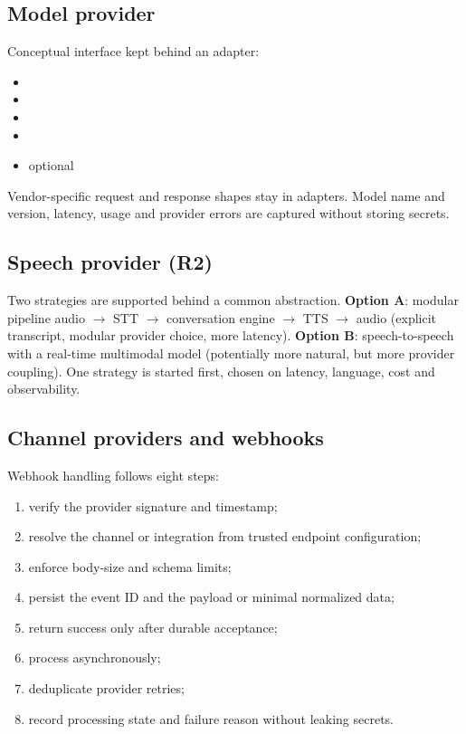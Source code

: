 \subsection{Model provider}
Conceptual interface kept behind an adapter:
\begin{itemize}
  \item {}
  \item {}
  \item {}
  \item {}
  \item optional 
\end{itemize}
Vendor-specific request and response shapes stay in adapters. Model name and version, latency, usage and provider errors are captured without storing secrets.

\subsection{Speech provider (R2)}
Two strategies are supported behind a common abstraction. \textbf{Option A}: modular pipeline audio $\rightarrow$ STT $\rightarrow$ conversation engine $\rightarrow$ TTS $\rightarrow$ audio (explicit transcript, modular provider choice, more latency). \textbf{Option B}: speech-to-speech with a real-time multimodal model (potentially more natural, but more provider coupling). One strategy is started first, chosen on latency, language, cost and observability.

\subsection{Channel providers and webhooks}
Webhook handling follows eight steps:
\begin{enumerate}
  \item verify the provider signature and timestamp;
  \item resolve the channel or integration from trusted endpoint configuration;
  \item enforce body-size and schema limits;
  \item persist the event ID and the payload or minimal normalized data;
  \item return success only after durable acceptance;
  \item process asynchronously;
  \item deduplicate provider retries;
  \item record processing state and failure reason without leaking secrets.
\end{enumerate}


